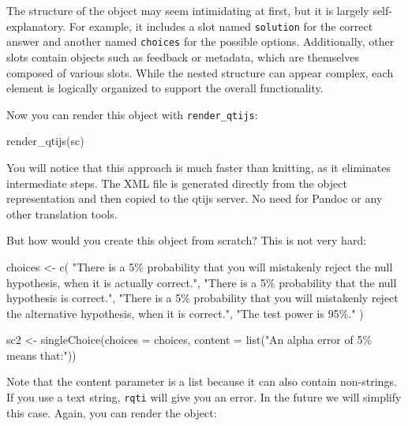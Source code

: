 \documentclass[twoside]{tufte-book}
\newenvironment{Shaded}{}{}
\newcommand{\AttributeTok}[1]{\textcolor[rgb]{0.49,0.56,0.16}{#1}}
\newcommand{\FunctionTok}[1]{\textcolor[rgb]{0.02,0.16,0.49}{#1}}
\newcommand{\NormalTok}[1]{#1}
\newcommand{\OtherTok}[1]{\textcolor[rgb]{0.00,0.44,0.13}{#1}}
\newcommand{\StringTok}[1]{\textcolor[rgb]{0.25,0.44,0.63}{#1}}
\begin{document}
The structure of the object may seem intimidating at first, but it is largely self-explanatory. For example, it includes a slot named \texttt{solution} for the correct answer and another named \texttt{choices} for the possible options. Additionally, other slots contain objects such as feedback or metadata, which are themselves composed of various slots. While the nested structure can appear complex, each element is logically organized to support the overall functionality.

Now you can render this object with \texttt{render\_qtijs}:

\begin{Shaded}
\begin{Highlighting}[]
\FunctionTok{render\_qtijs}\NormalTok{(sc)}
\end{Highlighting}
\end{Shaded}

You will notice that this approach is much faster than knitting, as it eliminates intermediate steps. The XML file is generated directly from the object representation and then copied to the qtijs server. No need for Pandoc or any other translation tools.

But how would you create this object from scratch? This is not very hard:

\begin{Shaded}
\begin{Highlighting}[]
\NormalTok{choices }\OtherTok{\textless{}{-}} \FunctionTok{c}\NormalTok{(}
  \StringTok{"There is a 5\% probability that you will mistakenly reject the null}
\StringTok{ hypothesis, when it is actually correct."}\NormalTok{,}
  \StringTok{"There is a 5\% probability that the null hypothesis is correct."}\NormalTok{,}
  \StringTok{"There is a 5\% probability that you will mistakenly reject the alternative}
\StringTok{ hypothesis, when it is correct."}\NormalTok{,}
  \StringTok{"The test power is 95\%."}
\NormalTok{)}

\NormalTok{sc2 }\OtherTok{\textless{}{-}} \FunctionTok{singleChoice}\NormalTok{(}\AttributeTok{choices =}\NormalTok{ choices, }
                    \AttributeTok{content =} \FunctionTok{list}\NormalTok{(}\StringTok{"An alpha error of 5\% means that:"}\NormalTok{))}
\end{Highlighting}
\end{Shaded}

Note that the content parameter is a list because it can also contain non-strings. If you use a text string, \texttt{rqti} will give you an error. In the future we will simplify this case. Again, you can render the object:
\end{document}
